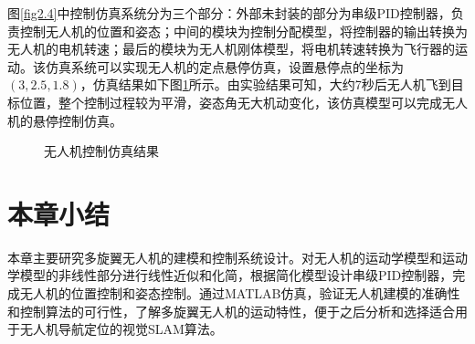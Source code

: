 图\ref{fig2.4}中控制仿真系统分为三个部分：外部未封装的部分为串级PID控制器，负责控制无人机的位置和姿态；中间的模块为控制分配模型，将控制器的输出转换为无人机的电机转速；最后的模块为无人机刚体模型，将电机转速转换为飞行器的运动。该仿真系统可以实现无人机的定点悬停仿真，设置悬停点的坐标为$(3,2.5,1.8)$，仿真结果如下图\ref{fig2.5}所示。由实验结果可知，大约7秒后无人机飞到目标位置，整个控制过程较为平滑，姿态角无大机动变化，该仿真模型可以完成无人机的悬停控制仿真。

\begin{figure}[h]
\centering
\caption{无人机控制仿真结果}
\label{fig2.5}
\end{figure}


\section{本章小结}
本章主要研究多旋翼无人机的建模和控制系统设计。对无人机的运动学模型和运动学模型的非线性部分进行线性近似和化简，根据简化模型设计串级PID控制器，完成无人机的位置控制和姿态控制。通过MATLAB仿真，验证无人机建模的准确性和控制算法的可行性，了解多旋翼无人机的运动特性，便于之后分析和选择适合用于无人机导航定位的视觉SLAM算法。

